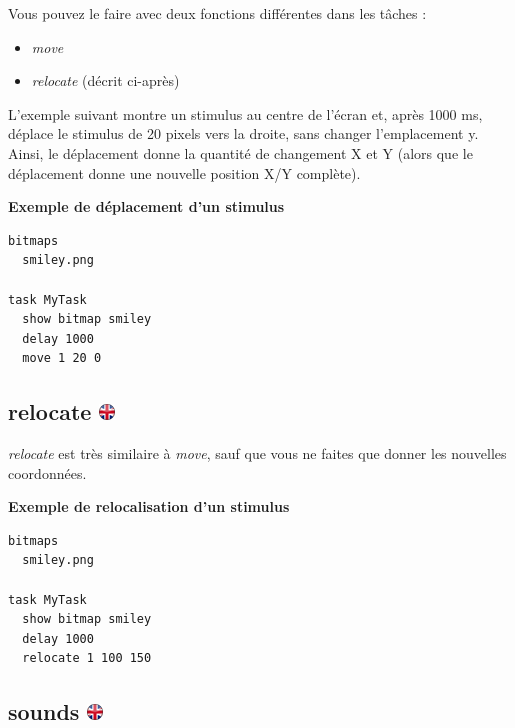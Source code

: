 \documentclass[
]{book}
\providecommand{\tightlist}{%
  \setlength{\itemsep}{0pt}\setlength{\parskip}{0pt}}
\begin{document}
Vous pouvez le faire avec deux fonctions différentes dans les tâches :

\begin{itemize}
\tightlist
\item
  \emph{move}
\item
  \emph{relocate} (décrit ci-après)
\end{itemize}

L'exemple suivant montre un stimulus au centre de l'écran et, après 1000 ms, déplace le stimulus de 20 pixels vers la droite, sans changer l'emplacement y. Ainsi, le déplacement donne la quantité de changement X et Y (alors que le déplacement donne une nouvelle position X/Y complète).

\textbf{Exemple de déplacement d'un stimulus}

\begin{verbatim}
bitmaps
  smiley.png

task MyTask
  show bitmap smiley
  delay 1000
  move 1 20 0
\end{verbatim}

\hypertarget{relocate}{%
\subsection[relocate ]{\texorpdfstring{relocate \href{https://www.psytoolkit.org/doc3.4.0/syntax.html\#relocate}{\protect\includegraphics{img/ukflag.png}}}{relocate }}\label{relocate}}

\emph{relocate} est très similaire à \emph{move}, sauf que vous ne faites que donner les nouvelles coordonnées.

\textbf{Exemple de relocalisation d'un stimulus}

\begin{verbatim}
bitmaps
  smiley.png

task MyTask
  show bitmap smiley
  delay 1000
  relocate 1 100 150
\end{verbatim}

\hypertarget{sounds}{%
\subsection[sounds ]{\texorpdfstring{sounds \href{https://www.psytoolkit.org/doc3.4.0/syntax.html\#sounds}{\protect\includegraphics{img/ukflag.png}}}{sounds }}\label{sounds}}
\end{document}
